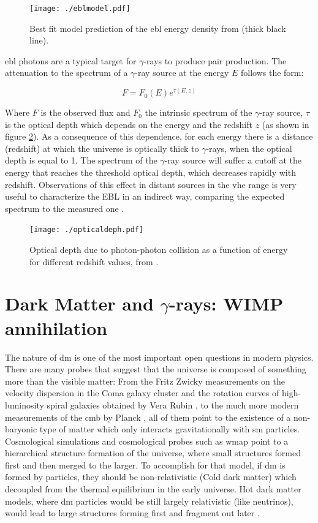 \documentclass[main.tex]{subfiles}
\begin{document}
\begin{figure}
\centering
 \texttt{[image: ./eblmodel.pdf]}
  \caption{Best fit model prediction of the \gls{ebl} energy density from \cite{FranceschiniEBL} (thick black line).}
    \label{fig:eblmodel}
\end{figure}

\gls{ebl} photons are a typical target for $\gamma$-rays to produce pair production. The attenuation to the spectrum of a $\gamma$-ray source at the energy $E$ follows the form:

\begin{equation}
    F = F_{0}(E) e^{\tau(E,z)} 
\end{equation}

Where $F$ is the observed flux and $F_{0}$ the intrinsic spectrum of the $\gamma$-ray source, $\tau$ is the optical depth which depends on the energy and the redshift $z$ (as shown in figure \ref{fig:depth}). As a consequence of this dependence, for each energy there is a distance (redshift) at which the universe is optically thick to $\gamma$-rays, when the optical depth is equal to 1. The spectrum of the $\gamma$-ray source will suffer a cutoff at the energy that reaches the threshold optical depth, which decreases rapidly with redshift. Observations of this effect in distant sources in the \gls{vhe} range is very useful to characterize the EBL in an indirect way, comparing the expected spectrum to the measured one \cite{2017ICRCEBL}.

\begin{figure}
\centering
 \texttt{[image: ./opticaldeph.pdf]}
  \caption{Optical depth due to photon-photon collision as a function of energy for different redshift values, from \cite{FranceschiniEBL}.}
    \label{fig:depth}
\end{figure}


\section{Dark Matter and $\gamma$-rays: WIMP annihilation} \label{sec:DM}

The nature of \gls{dm} is one of the most important open questions in modern physics. There are many probes that suggest that the universe is composed of something more than the visible matter: From the Fritz Zwicky measurements on the velocity dispersion in the Coma galaxy cluster \cite{Zwicky} and the rotation curves of high-luminosity spiral galaxies obtained by Vera Rubin \cite{1978Rubin}, to the much more modern measurements of the \gls{cmb} by Planck \cite{2014Planck}, all of them point to the existence of a non-baryonic type of matter which only interacts gravitationally with \gls{sm} particles. Cosmological simulations and cosmological probes such as \gls{wmap} point to a hierarchical structure formation of the universe, where small structures formed first and then merged to the larger. To accomplish for that model, if \gls{dm} is formed by particles, they should be non-relativistic (Cold dark matter) which decoupled from the thermal equilibrium in the early universe. Hot dark matter models, where \gls{dm} particles would be still largely relativistic (like neutrinos), would lead to large structures forming first and fragment out later \cite{2003Olive}. 
\end{document}
